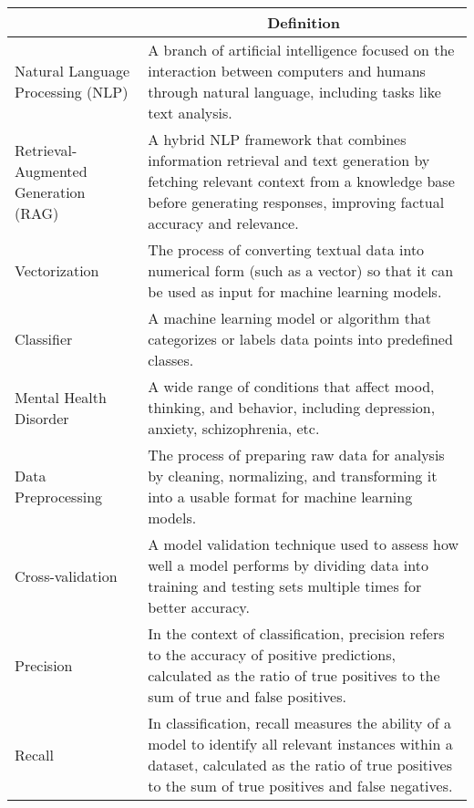 \begin{center}

\begin{tabular}{|p{4cm}|p{10cm}|}
  \hline
  \rowcolor{lightestgray}
  \multicolumn{1}{|c|}{\textbf{Term}} & \multicolumn{1}{c|}{\textbf{Definition}} \\

  \hline 
  Natural Language \newline Processing (NLP) & A branch of artificial intelligence focused on the interaction between computers and humans through natural language, including tasks like text analysis. \\

  \hline 
  Retrieval-Augmented Generation (RAG) & A hybrid NLP framework that combines information retrieval and text generation by fetching relevant context from a knowledge base before generating responses, improving factual accuracy and relevance. \\


  \hline 
  Vectorization & The process of converting textual data into numerical form (such as a vector) so that it can be used as input for machine learning models. \\

  \hline 
  Classifier & A machine learning model or algorithm that categorizes or labels data points into predefined classes. \\

  \hline
  Mental Health Disorder & A wide range of conditions that affect mood, thinking, and behavior, including depression, anxiety, schizophrenia, etc. \\

  \hline
  Data Preprocessing & The process of preparing raw data for analysis by cleaning, normalizing, and transforming it into a usable format for machine learning models. \\

  \hline 
  Cross-validation & A model validation technique used to assess how well a model performs by dividing data into training and testing sets multiple times for better accuracy. \\

  \hline
  Precision & In the context of classification, precision refers to the accuracy of positive predictions, calculated as the ratio of true positives to the sum of true and false positives. \\

  \hline
  Recall & In classification, recall measures the ability of a model to identify all relevant instances within a dataset, calculated as the ratio of true positives to the sum of true positives and false negatives. \\
  

\end{tabular}
\end{center}
